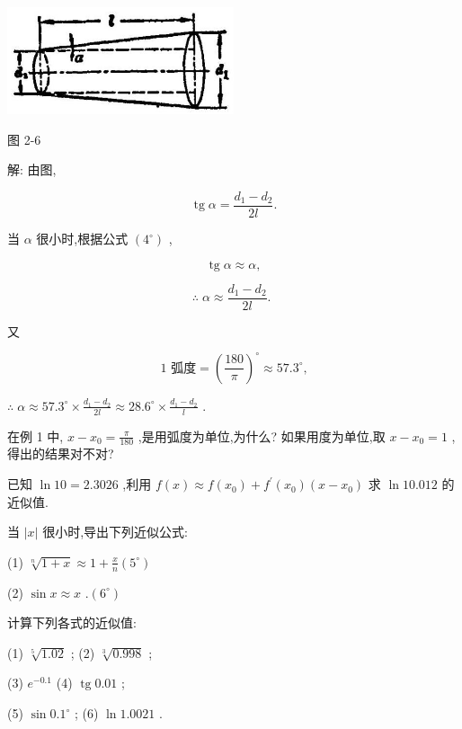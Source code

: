 \documentclass[lang=cn,newtx,10pt,scheme=chinese]{elegantbook}
\begin{document}
\begin{center}
\includegraphics[max width=0.5\textwidth]{images/01912c18-5c3f-733d-b775-749ba9897a9d_120_883650.jpg}
\end{center}

图 2-6

解: 由图,

\[
\operatorname{tg}\alpha = \frac{{d}_{1} - {d}_{2}}{2l}.
\]

当 \(\alpha\) 很小时,根据公式 \(\left( {4}^{ \circ }\right)\) ,

\[
\operatorname{tg}\alpha \approx \alpha ,
\]

\[
\therefore \;\alpha \approx \frac{{d}_{1} - {d}_{2}}{2l}\text{. }
\]

又

\[
\text{1 弧度} = {\left( \frac{180}{\pi }\right) }^{ \circ } \approx {57.3}^{ \circ }\text{,}
\]

\(\therefore \;\alpha \approx {57.3}^{ \circ } \times \frac{{d}_{1} - {d}_{2}}{2l} \approx {28.6}^{ \circ } \times \frac{{d}_{1} - {d}_{2}}{l}\) .

\begin{problemset}[练习]

\item 在例 1 中, \(x - {x}_{0} = \frac{\pi }{180}\) ,是用弧度为单位,为什么? 如果用度为单位,取 \(x - {x}_{0} = 1\) ,得出的结果对不对?

\item 已知 \(\ln {10} = {2.3026}\) ,利用 \(f\left( x\right) \approx f\left( {x}_{0}\right) + {f}^{\prime }\left( {x}_{0}\right) \left( {x - {x}_{0}}\right)\) 求 \(\ln {10.012}\) 的近似值.

\item 当 \(\left| x\right|\) 很小时,导出下列近似公式:

(1) \(\sqrt[n]{1 + x} \approx 1 + \frac{x}{n}\)\(\left( {5}^{ \circ }\right)\)

(2) \(\sin x \approx x\) .\(\left( {6}^{ \circ }\right)\)

\item 计算下列各式的近似值:

(1) \(\sqrt[5]{1.02}\) ; (2) \(\sqrt[3]{0.998}\) ;

(3) \({e}^{-{0.1}}\) (4) \(\operatorname{tg}{0.01}\) ;

(5) \(\sin {0.1}^{ \circ }\) ; (6) \(\ln {1.0021}\) .

\end{problemset}
\end{document}
